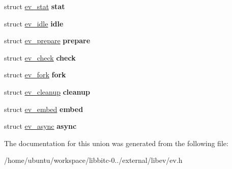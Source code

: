 \begin{DoxyCompactItemize}
\item 
\hypertarget{unionev__any__watcher_a4daa1c06972b03f1e574012ff85f7849}{struct \hyperlink{structev__stat}{ev\-\_\-stat} {\bfseries stat}}\label{unionev__any__watcher_a4daa1c06972b03f1e574012ff85f7849}

\item 
\hypertarget{unionev__any__watcher_a981b4fb4bb0c57edde815eb5c653ab21}{struct \hyperlink{structev__idle}{ev\-\_\-idle} {\bfseries idle}}\label{unionev__any__watcher_a981b4fb4bb0c57edde815eb5c653ab21}

\item 
\hypertarget{unionev__any__watcher_ab8e9044b76b083a745fe88887035c5b7}{struct \hyperlink{structev__prepare}{ev\-\_\-prepare} {\bfseries prepare}}\label{unionev__any__watcher_ab8e9044b76b083a745fe88887035c5b7}

\item 
\hypertarget{unionev__any__watcher_a11934d4f1f244f75b706db27abfea16e}{struct \hyperlink{structev__check}{ev\-\_\-check} {\bfseries check}}\label{unionev__any__watcher_a11934d4f1f244f75b706db27abfea16e}

\item 
\hypertarget{unionev__any__watcher_a63e589011bdf5d405a87b0b452d0aa18}{struct \hyperlink{structev__fork}{ev\-\_\-fork} {\bfseries fork}}\label{unionev__any__watcher_a63e589011bdf5d405a87b0b452d0aa18}

\item 
\hypertarget{unionev__any__watcher_acf48afbff0708cefa05cfdb2a3f89c52}{struct \hyperlink{structev__cleanup}{ev\-\_\-cleanup} {\bfseries cleanup}}\label{unionev__any__watcher_acf48afbff0708cefa05cfdb2a3f89c52}

\item 
\hypertarget{unionev__any__watcher_adecc46ee7ea240767431d1247109ae87}{struct \hyperlink{structev__embed}{ev\-\_\-embed} {\bfseries embed}}\label{unionev__any__watcher_adecc46ee7ea240767431d1247109ae87}

\item 
\hypertarget{unionev__any__watcher_ad0452986b798bbf59f852b3e4d164cfe}{struct \hyperlink{structev__async}{ev\-\_\-async} {\bfseries async}}\label{unionev__any__watcher_ad0452986b798bbf59f852b3e4d164cfe}

\end{DoxyCompactItemize}


The documentation for this union was generated from the following file\-:\begin{DoxyCompactItemize}
\item 
/home/ubuntu/workspace/libbitc-\/0../external/libev/ev.\-h\end{DoxyCompactItemize}
